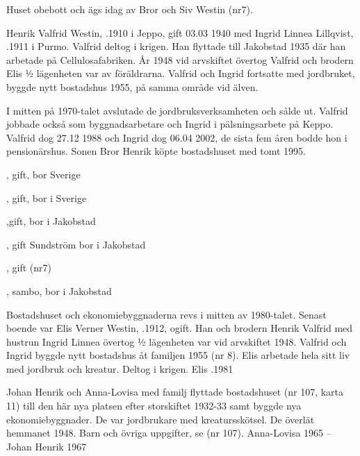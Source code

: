 
Huset obebott och ägs idag av Bror och Siv Westin (nr7).

Henrik Valfrid Westin, .1910 i Jeppo, gift 03.03 1940 med Ingrid Linnea Lillqvist, .1911 i Purmo. Valfrid deltog i krigen. Han flyttade till Jakobstad 1935 där han arbetade på Cellulosafabriken.  År 1948 vid arvskiftet övertog Valfrid och brodern Elis ½ lägenheten var av föräldrarna. Valfrid och Ingrid fortsatte med jordbruket, byggde nytt bostadshus 1955, på samma område vid älven.

I mitten på 1970-talet avslutade de jordbruksverksamheten och sålde ut. Valfrid jobbade också som byggnadsarbetare och Ingrid i pälsningsarbete på Keppo. Valfrid dog 27.12 1988 och Ingrid dog 06.04 2002, de sista fem åren bodde hon i  pensionärshus. Sonen Bror Henrik köpte bostadshuset med tomt 1995.
\begin{jhchildren}
  \item {}, gift, bor Sverige
  \item {}, gift, bor i Sverige
  \item {},gift, bor i Jakobstad
  \item {}, gift Sundström bor i Jakobstad
  \item {}, gift (nr7)
  \item {}, sambo, bor i Jakobstad
\end{jhchildren}




Bostadshuset och ekonomiebyggnaderna revs i mitten av 1980-talet. Senast boende var Elis Verner Westin, .1912, ogift. Han och brodern Henrik Valfrid med hustrun Ingrid Linnea övertog ½ lägenheten var vid arvskiftet 1948. Valfrid och Ingrid byggde nytt bostadshus åt familjen 1955 (nr 8). Elis arbetade hela sitt liv med jordbruk och kreatur. Deltog i krigen. Elis .1981

Johan Henrik och Anna-Lovisa med familj flyttade bostadshuset (nr 107, karta 11) till den här nya platsen efter storskiftet 1932-33 samt byggde nya ekonomiebyggnader. De var jordbrukare med kreatursskötsel. De överlät hemmanet 1948.
Barn och övriga uppgifter, se (nr 107).
Anna-Lovisa  1965  --  Johan Henrik  1967



